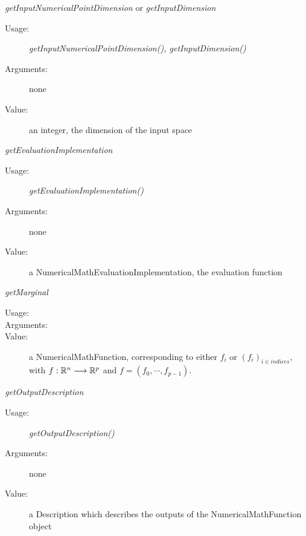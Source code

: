 \begin{description}
\begin{description}
\item \textit{getInputNumericalPointDimension} or   \textit{getInputDimension}
\begin{description}
\item[Usage:] \textit{getInputNumericalPointDimension(), getInputDimension()}
\item[Arguments:] none
\item[Value:] an integer, the dimension of the input space
\end{description}
\bigskip


\item \textit{getEvaluationImplementation}
\begin{description}
\item[Usage:] \textit{getEvaluationImplementation()}
\item[Arguments:] none
\item[Value:] a NumericalMathEvaluationImplementation, the evaluation function
\end{description}
\bigskip

\item \textit{getMarginal}
\begin{description}
\item[Usage:] \rule{0pt}{1em}
\item[Arguments:] \rule{0pt}{1em}
\item[Value:] a NumericalMathFunction, corresponding to either $f_i$  or $(f_i)_{i \in indices}$, with $f: {\mathbb R}^n  \longrightarrow {\mathbb R}^p$ and $f = (f_0, \cdots, f_{p-1})$.
\end{description}
\bigskip

\item \textit{getOutputDescription}
\begin{description}
\item[Usage:] \textit{getOutputDescription()}
\item[Arguments:] none
\item[Value:] a Description which describes the outputs
of the NumericalMathFunction object
\end{description}
\bigskip


\end{description}
\end{description}
